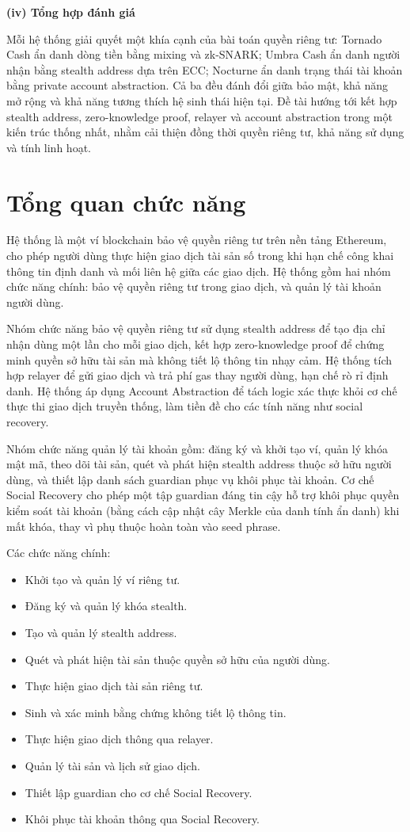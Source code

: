 \documentclass[../DoAn.tex]{subfiles}
\begin{document}
\textbf{(iv) Tổng hợp đánh giá}

Mỗi hệ thống giải quyết một khía cạnh của bài toán quyền riêng tư: Tornado Cash ẩn danh dòng tiền bằng mixing và zk-SNARK; Umbra Cash ẩn danh người nhận bằng stealth address dựa trên ECC; Nocturne ẩn danh trạng thái tài khoản bằng private account abstraction. Cả ba đều đánh đổi giữa bảo mật, khả năng mở rộng và khả năng tương thích hệ sinh thái hiện tại. Đề tài hướng tới kết hợp stealth address, zero-knowledge proof, relayer và account abstraction trong một kiến trúc thống nhất, nhằm cải thiện đồng thời quyền riêng tư, khả năng sử dụng và tính linh hoạt.


\section{Tổng quan chức năng}
\label{section:2.2}

Hệ thống là một ví blockchain bảo vệ quyền riêng tư trên nền tảng Ethereum, cho phép người dùng thực hiện giao dịch tài sản số trong khi hạn chế công khai thông tin định danh và mối liên hệ giữa các giao dịch. Hệ thống gồm hai nhóm chức năng chính: bảo vệ quyền riêng tư trong giao dịch, và quản lý tài khoản người dùng.

Nhóm chức năng bảo vệ quyền riêng tư sử dụng stealth address để tạo địa chỉ nhận dùng một lần cho mỗi giao dịch, kết hợp zero-knowledge proof để chứng minh quyền sở hữu tài sản mà không tiết lộ thông tin nhạy cảm. Hệ thống tích hợp relayer để gửi giao dịch và trả phí gas thay người dùng, hạn chế rò rỉ định danh. Hệ thống áp dụng Account Abstraction để tách logic xác thực khỏi cơ chế thực thi giao dịch truyền thống, làm tiền đề cho các tính năng như social recovery.

Nhóm chức năng quản lý tài khoản gồm: đăng ký và khởi tạo ví, quản lý khóa mật mã, theo dõi tài sản, quét và phát hiện stealth address thuộc sở hữu người dùng, và thiết lập danh sách guardian phục vụ khôi phục tài khoản. Cơ chế Social Recovery cho phép một tập guardian đáng tin cậy hỗ trợ khôi phục quyền kiểm soát tài khoản (bằng cách cập nhật cây Merkle của danh tính ẩn danh) khi mất khóa, thay vì phụ thuộc hoàn toàn vào seed phrase.

Các chức năng chính:

\begin{itemize}
\item Khởi tạo và quản lý ví riêng tư.
\item Đăng ký và quản lý khóa stealth.
\item Tạo và quản lý stealth address.
\item Quét và phát hiện tài sản thuộc quyền sở hữu của người dùng.
\item Thực hiện giao dịch tài sản riêng tư.
\item Sinh và xác minh bằng chứng không tiết lộ thông tin.
\item Thực hiện giao dịch thông qua relayer.
\item Quản lý tài sản và lịch sử giao dịch.
\item Thiết lập guardian cho cơ chế Social Recovery.
\item Khôi phục tài khoản thông qua Social Recovery.
\end{itemize}
\end{document}
